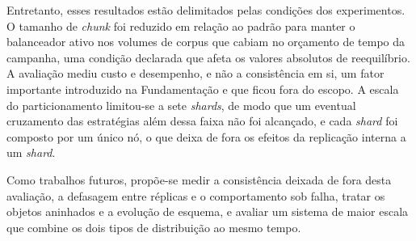 Entretanto, esses resultados estão delimitados pelas condições dos experimentos. O tamanho de \textit{chunk} foi reduzido em relação ao padrão para manter o balanceador ativo nos volumes de corpus que cabiam no orçamento de tempo da campanha, uma condição declarada que afeta os valores absolutos de reequilíbrio. A avaliação mediu custo e desempenho, e não a consistência em si, um fator importante introduzido na Fundamentação e que ficou fora do escopo. A escala do particionamento limitou-se a sete \textit{shards}, de modo que um eventual cruzamento das estratégias além dessa faixa não foi alcançado, e cada \textit{shard} foi composto por um único nó, o que deixa de fora os efeitos da replicação interna a um \textit{shard}.

Como trabalhos futuros, propõe-se medir a consistência deixada de fora desta avaliação, a defasagem entre réplicas e o comportamento sob falha, tratar os objetos aninhados e a evolução de esquema, e avaliar um sistema de maior escala que combine os dois tipos de distribuição ao mesmo tempo.
